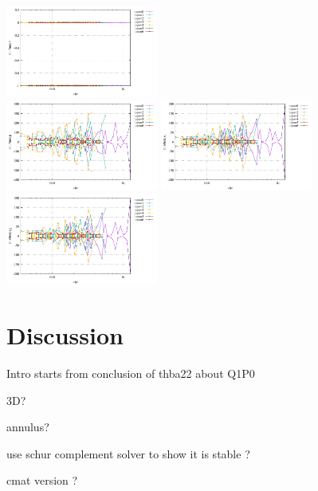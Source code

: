 \begin{center}
\includegraphics[width=5cm]{python_codes/fieldstone_78/results/stats_v_exp14.pdf}\\
\includegraphics[width=5cm]{python_codes/fieldstone_78/results/stats_p_exp14.pdf}
\includegraphics[width=5cm]{python_codes/fieldstone_78/results/stats_q1_exp14.pdf}
\includegraphics[width=5cm]{python_codes/fieldstone_78/results/stats_q2_exp14.pdf}
\end{center}







\newpage

\section*{Discussion}

Intro starts from conclusion of thba22 about Q1P0

3D?

annulus?

use schur complement solver to show it is stable ?

cmat version ? 


